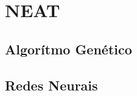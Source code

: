 \chapter{NEAT}

\lipsum[1-2]

\section{Algor{\'i}tmo Gen{\'e}tico}

\lipsum[3-4]

\section{Redes Neurais}

\lipsum[5-6]
